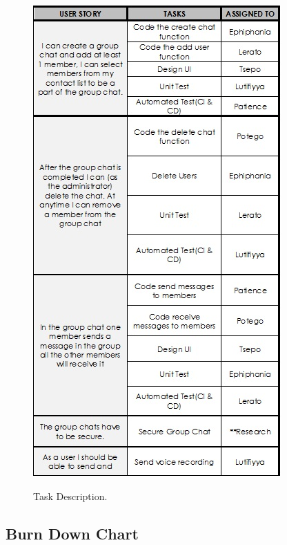 \documentclass[a4paper]{article}
\begin{document}
\begin{figure}
\includegraphics[width=1\linewidth]{./pictures/role.jpg}\\
\caption{\label{fig:Discription}Task Description.}
\end{figure}

\subsection{Burn Down Chart}
\end{document}
